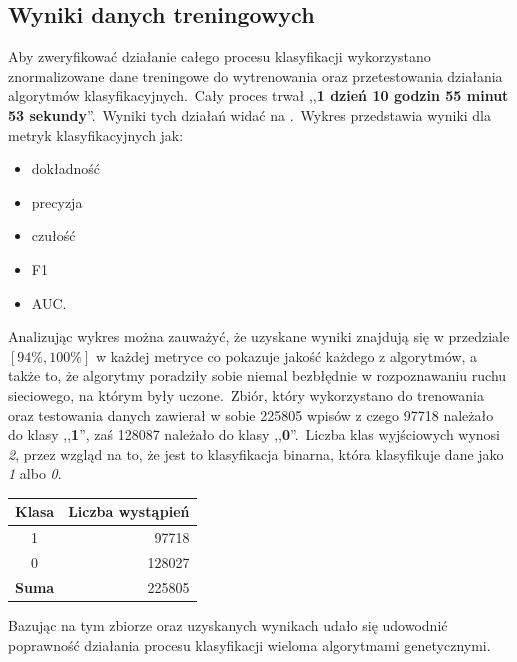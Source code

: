 \subsection{Wyniki danych treningowych}
Aby zweryfikować działanie całego procesu klasyfikacji wykorzystano znormalizowane dane treningowe do wytrenowania oraz przetestowania działania algorytmów klasyfikacyjnych.\ Cały proces trwał ,,\textbf{1 dzień 10 godzin 55 minut 53 sekundy}''.\ Wyniki tych działań widać na .\ Wykres przedstawia wyniki dla metryk klasyfikacyjnych jak:
\begin{itemize}
    \item dokładność
    \item precyzja
    \item czułość
    \item F1
    \item AUC.
\end{itemize}


Analizując wykres można zauważyć, że uzyskane wyniki znajdują się w przedziale $[94\%, 100\%]$ w każdej metryce co pokazuje jakość każdego z algorytmów, a także to, że algorytmy poradziły sobie niemal bezbłędnie w rozpoznawaniu ruchu sieciowego, na którym były uczone.\ Zbiór, który wykorzystano do trenowania oraz testowania danych zawierał w sobie 225805 wpisów z czego 97718 należało do klasy ,,\textbf{1}'', zaś 128087 należało do klasy ,,\textbf{0}''.\ Liczba klas wyjściowych wynosi \textit{2}, przez wzgląd na to, że jest to klasyfikacja binarna, która klasyfikuje dane jako \textit{1} albo \textit{0}.

\begin{table}[H]
    \centering
    \label{tab:trening-data-label}
    \begin{tabular}{|c|r|}
        \hline
        \textbf{Klasa} & \textbf{Liczba wystąpień} \\ \hline
        1              & 97718                     \\ \hline
        0              & 128027                    \\ \hline
        \textbf{Suma}  & 225805                    \\ \hline
    \end{tabular}
\end{table}

Bazując na tym zbiorze oraz uzyskanych wynikach udało się udowodnić poprawność działania procesu klasyfikacji wieloma algorytmami genetycznymi.

